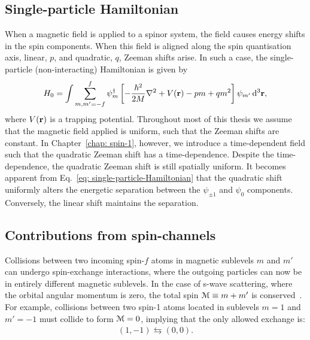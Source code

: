 \subsection{Single-particle Hamiltonian}
When a magnetic field is applied to a spinor system, the field causes energy
shifts in the spin components.
When this field is aligned along the spin quantisation axis, linear, \(p\), and
quadratic, \(q\), Zeeman shifts arise.
In such a case, the single-particle (non-interacting) Hamiltonian is given
by~\cite{Kawaguchi2012}
\begin{equation}\label{eq: single-particle-Hamiltonian}
    H_0 = \int \sum_{m,m'=-f}^{f} \psi_m^\dagger \left[
        -\frac{\hbar^2}{2M}\nabla^2 + V(\vb{r})
        - pm + qm^2\right]\psi_{m'} \, \dd^3\vb{r},
\end{equation}
where \(V(\vb{r})\) is a trapping potential.
Throughout most of this thesis we assume that the magnetic field applied is
uniform, such that the Zeeman shifts are constant.
In Chapter~\ref{chap: spin-1}, however, we introduce a time-dependent field
such that the quadratic Zeeman shift has a time-dependence.
Despite the time-dependence, the quadratic Zeeman shift is still spatially
uniform.
It becomes apparent from Eq.~\eqref{eq: single-particle-Hamiltonian} that the
quadratic shift uniformly alters the energetic separation between the
\(\psi_{\pm 1}\) and \(\psi_0\) components.
Conversely, the linear shift maintains the separation.

\subsection{Contributions from spin-channels}
Collisions between two incoming spin-\(f\) atoms in magnetic sublevels \(m\)
and \(m'\) can undergo spin-exchange interactions, where the outgoing particles
can now be in entirely different magnetic sublevels.
In the case of s-wave scattering, where the orbital angular momentum is zero,
the total spin \(\EuScript{M} \equiv m + m'\) is conserved~\cite{Kawaguchi2012}.
For example, collisions between two spin-1 atoms located in sublevels \(m=1\)
and \(m'=-1\) must collide to form \(\EuScript{M} = 0\), implying that the only
allowed exchange is:
\begin{align}
    (1, -1) \leftrightarrows (0, 0).
\end{align}

